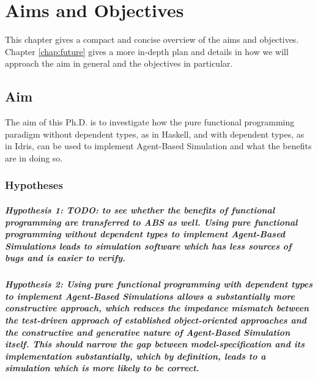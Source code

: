 \chapter{Aims and Objectives}
\label{chap:aimsObj}

This chapter gives a compact and concise overview of the aims and objectives. Chapter \ref{chap:future} gives a more in-depth plan and details in how we will approach the aim in general and the objectives in particular.

\section{Aim}
The aim of this Ph.D. is to investigate how the pure functional programming paradigm without dependent types, as in Haskell, and with dependent types, as in Idris, can be used to implement Agent-Based Simulation and what the benefits are in doing so.

\subsection{Hypotheses}
\paragraph{Hypothesis 1: TODO: to see whether the benefits of functional programming are transferred to ABS as well. Using pure functional programming without dependent types to implement Agent-Based Simulations leads to simulation software which has less sources of bugs and is easier to verify.} %

\paragraph{Hypothesis 2: Using pure functional programming with dependent types to implement Agent-Based Simulations allows a substantially more constructive approach, which reduces the impedance mismatch between the test-driven approach of established object-oriented approaches and the constructive and generative nature of Agent-Based Simulation itself. This should narrow the gap between model-specification and its implementation substantially, which by definition, leads to a simulation which is more likely to be correct.}

